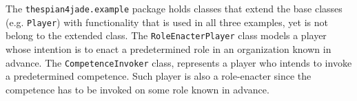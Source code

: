The \texttt{thespian4jade.example} package holds classes that extend the base classes (e.g. \texttt{Player}) with functionality that is used in all three examples, yet is not belong to the extended class.
The \texttt{RoleEnacterPlayer} class models a player whose intention is to enact a predetermined role in an organization known in advance.
The \texttt{CompetenceInvoker} class, represents a player who intends to invoke a predetermined competence. Such player is also a role-enacter since the competence has to be invoked on some role known in advance.